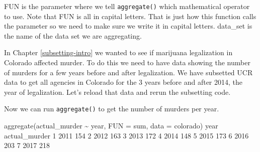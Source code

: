 \documentclass[
]{krantz}
\makeatletter
\newenvironment{Shaded}{\begin{snugshade}}{\end{snugshade}}
\newcommand{\AttributeTok}[1]{\textcolor[rgb]{0.61,0.61,0.61}{#1}}
\newcommand{\DecValTok}[1]{\textcolor[rgb]{0.06,0.06,0.06}{#1}}
\newcommand{\FunctionTok}[1]{\textcolor[rgb]{0,0,0}{#1}}
\newcommand{\NormalTok}[1]{#1}
\newcommand{\OtherTok}[1]{\textcolor[rgb]{0.37,0.37,0.37}{#1}}
\newcommand{\SpecialCharTok}[1]{\textcolor[rgb]{0,0,0}{#1}}
\newcommand{\StringTok}[1]{\textcolor[rgb]{0.5,0.5,0.5}{#1}}
\newenvironment{kframe}{%
\medskip{}
\setlength{\fboxsep}{.8em}
 \def\at@end@of@kframe{}%
 \ifinner\ifhmode%
  \def\at@end@of@kframe{\end{minipage}}%
  \begin{minipage}{\columnwidth}%
 \fi\fi%
 \def\FrameCommand##1{\hskip\@totalleftmargin \hskip-\fboxsep
 \colorbox{shadecolor}{##1}\hskip-\fboxsep
     \hskip-\linewidth \hskip-\@totalleftmargin \hskip\columnwidth}%
 \MakeFramed {\advance\hsize-\width
   \@totalleftmargin\z@ \linewidth\hsize
   \@setminipage}}%
 {\par\unskip\endMakeFramed%
 \at@end@of@kframe}
\renewenvironment{Shaded}{\begin{kframe}}{\end{kframe}}
\makeatother
\begin{document}
FUN is the parameter where we tell \texttt{aggregate()} which mathematical operator to use. Note that FUN is all in capital letters. That is just how this function calls the parameter so we need to make sure we write it in capital letters. data\_set is the name of the data set we are aggregating.

In Chapter \ref{subsetting-intro} we wanted to see if marijuana legalization in Colorado affected murder. To do this we need to have data showing the number of murders for a few years before and after legalization. We have subsetted UCR data to get all agencies in Colorado for the 3 years before and after 2014, the year of legalization. Let's reload that data and rerun the subsetting code.

\begin{Shaded}
\end{Shaded}

Now we can run \texttt{aggregate()} to get the number of murders per year.

\begin{Shaded}
\begin{Highlighting}[]
\FunctionTok{aggregate}\NormalTok{(actual\_murder }\SpecialCharTok{\textasciitilde{}}\NormalTok{ year, }\AttributeTok{FUN =}\NormalTok{ sum, }\AttributeTok{data =}\NormalTok{ colorado)}
\NormalTok{  year actual\_murder}
\DecValTok{1} \DecValTok{2011}           \DecValTok{154}
\DecValTok{2} \DecValTok{2012}           \DecValTok{163}
\DecValTok{3} \DecValTok{2013}           \DecValTok{172}
\DecValTok{4} \DecValTok{2014}           \DecValTok{148}
\DecValTok{5} \DecValTok{2015}           \DecValTok{173}
\DecValTok{6} \DecValTok{2016}           \DecValTok{203}
\DecValTok{7} \DecValTok{2017}           \DecValTok{218}
\end{Highlighting}
\end{Shaded}
\end{document}
